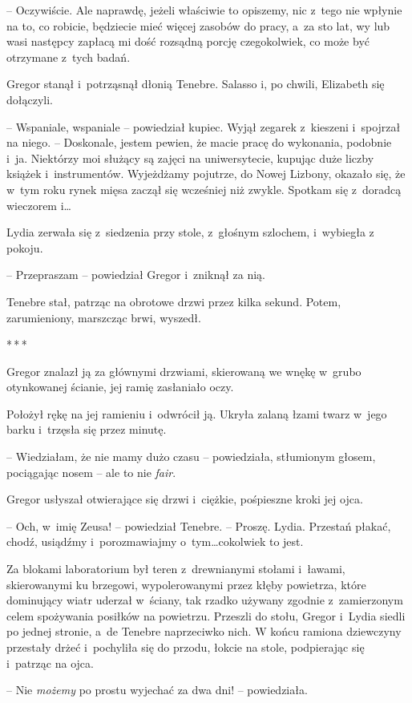 \documentclass[oneside,polish,12pt,sfheadings]{mwbk}
\newcommand{\threeast}{\bigskip\par\centerline{*\,*\,*}\medskip\par}%
\begin{document}
-- Oczywiście. Ale naprawdę, jeżeli właściwie to opiszemy, nic z~tego nie
wpłynie na to, co robicie, będziecie mieć więcej zasobów do pracy, a~za
sto lat, wy lub wasi następcy zapłacą mi dość rozsądną porcję
czegokolwiek, co może być otrzymane z~tych badań.

Gregor stanął i~potrząsnął dłonią Tenebre. Salasso i, po chwili,
Elizabeth się dołączyli.

-- Wspaniale, wspaniale -- powiedział kupiec. Wyjął zegarek z~kieszeni i~spojrzał na niego. -- Doskonale, jestem pewien, że macie pracę do
wykonania, podobnie i~ja. Niektórzy moi służący są zajęci na
uniwersytecie, kupując duże liczby książek i~instrumentów. Wyjeżdżamy
pojutrze, do Nowej Lizbony, okazało się, że w~tym roku rynek mięsa
zaczął się wcześniej niż zwykle. Spotkam się z~doradcą wieczorem i\ldots

Lydia zerwała się z~siedzenia przy stole, z~głośnym szlochem, i~wybiegła
z pokoju.

-- Przepraszam -- powiedział Gregor i~zniknął za nią.

Tenebre stał, patrząc na obrotowe drzwi przez kilka sekund. Potem,
zarumieniony, marszcząc brwi, wyszedł.

\threeast

Gregor znalazł ją za głównymi drzwiami, skierowaną we wnękę w~grubo otynkowanej ścianie, jej ramię zasłaniało oczy.

Położył rękę na jej ramieniu i~odwrócił ją. Ukryła zalaną łzami twarz w~jego barku i~trzęsła się przez minutę.

-- Wiedziałam, że nie mamy dużo czasu -- powiedziała, stłumionym głosem,
pociągając nosem -- ale to nie \emph{fair}.

Gregor usłyszał otwierające się drzwi i~ciężkie, pośpieszne kroki jej
ojca.

-- Och, w~imię Zeusa! -- powiedział Tenebre. -- Proszę. Lydia. Przestań
płakać, chodź, usiądźmy i~porozmawiajmy o~tym\ldots cokolwiek to jest.

Za blokami laboratorium był teren z~drewnianymi stołami i~ławami,
skierowanymi ku brzegowi, wypolerowanymi przez kłęby powietrza, które
dominujący wiatr uderzał w~ściany, tak rzadko używany zgodnie z~zamierzonym celem spożywania posiłków na powietrzu. Przeszli do stołu,
Gregor i~Lydia siedli po jednej stronie, a~de Tenebre naprzeciwko nich.
W końcu ramiona dziewczyny przestały drżeć i~pochyliła się do przodu,
łokcie na stole, podpierając się i~patrząc na ojca.

-- Nie \emph{możemy} po prostu wyjechać za dwa dni! -- powiedziała.
\end{document}
